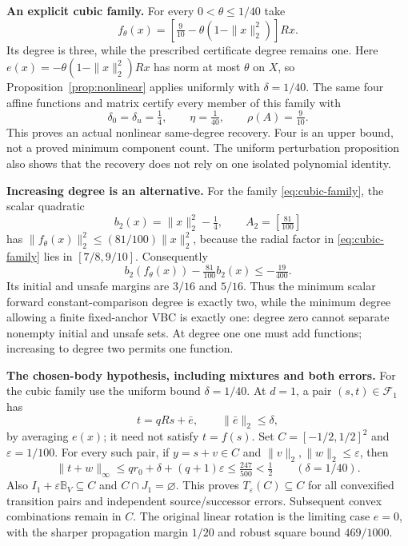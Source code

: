 \documentclass[journal,10pt]{IEEEtran}
\theoremstyle{definition}\newtheorem{definition}{Definition}
\theoremstyle{remark}
\newcommand{\ball}{\mathbb B_V}
\begin{document}
\textbf{An explicit cubic family.}
For every $0<\theta\leq1/40$ take
\begin{equation}\label{eq:cubic-family}
 f_\theta(x)=\left[\tfrac9{10}-\theta(1-\|x\|_2^2)\right]Rx.
\end{equation}
Its degree is three, while the prescribed certificate degree remains one.
Here $e(x)=-\theta(1-\|x\|_2^2)Rx$ has norm at most $\theta$ on $X$,
so Proposition~\ref{prop:nonlinear} applies uniformly with $\delta=1/40$.
The same four affine functions and matrix certify every member of this family with
\[
 \delta_0=\delta_u=\tfrac14,\qquad \eta=\tfrac1{40},\qquad \rho(A)=\tfrac9{10}.
\]
This proves an actual nonlinear same-degree recovery. Four is an upper bound, not a proved minimum component count. The uniform perturbation proposition also shows that the recovery does not rely on one isolated polynomial identity.

\textbf{Increasing degree is an alternative.}
For the family \eqref{eq:cubic-family}, the scalar quadratic
\[
 b_2(x)=\|x\|_2^2-\tfrac14,\qquad A_2=[\tfrac{81}{100}]
\]
has $\|f_\theta(x)\|_2^2\leq(81/100)\|x\|_2^2$, because the radial factor in \eqref{eq:cubic-family} lies in $[7/8,9/10]$. Consequently
\[
 b_2(f_\theta(x))-\tfrac{81}{100}b_2(x)\leq-\tfrac{19}{400}.
\]
Its initial and unsafe margins are $3/16$ and $5/16$. Thus the minimum
scalar forward constant-comparison degree is exactly two, while the minimum degree
allowing a finite fixed-anchor VBC is exactly one: degree zero cannot separate
nonempty initial and unsafe sets. At degree one one must add functions;
increasing to degree two permits one function.

\textbf{The chosen-body hypothesis, including mixtures and both errors.}
For the cubic family use the uniform bound $\delta=1/40$. At $d=1$, a pair $(s,t)\in\mathcal F_1$ has
\[
 t=qRs+\bar e,\qquad\|\bar e\|_2\leq\delta,
\]
by averaging $e(x)$; it need not satisfy $t=f(s)$.
Set $C=[-1/2,1/2]^2$ and $\varepsilon=1/100$.
For every such pair, if $y=s+v\in C$ and
$\|v\|_2,\|w\|_2\leq\varepsilon$, then
\[
 \|t+w\|_\infty
 \leq qr_0+\delta+(q+1)\varepsilon
 \leq\tfrac{247}{500}<\tfrac12
 \qquad(\delta=1/40).
\]
Also $I_1+\varepsilon\ball\subseteq C$ and $C\cap J_1=\varnothing$.
This proves $T_\varepsilon(C)\subseteq C$ for all convexified transition pairs
and independent source/successor errors. Subsequent convex combinations remain in $C$.
The original linear rotation is the limiting case $e=0$, with the sharper
propagation margin $1/20$ and robust square bound $469/1000$.
\end{document}
